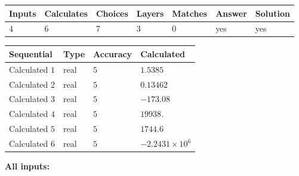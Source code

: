 \documentclass[12pt]{article}
\begin{document}
 

 
\vspace{0.3in}
   
   
   
   
\noindent\begin{tabular}{|l|l|l|l|l|l|l|}
 \hline
Inputs & Calculates & Choices & Layers & Matches & Answer & Solution \\ \hline
           4  & 
           6  & 
           7
  & 
           3  & 
           0  & 
  yes & 
  yes 
  \\ \hline
 \end{tabular}
   
   
   
   
\noindent{}
   
   
  
  
\noindent\begin{tabular}{|l|l|l|l|}
\hline
 Sequential & Type & Accuracy & Calculated \\ 
\hline
 
 
  Calculated $            1 $ & real & $            5  $ & 
 $ 1.5385 $ 
 \\  \hline  
 
 
  Calculated $            2 $ & real & $            5  $ & 
 $ 0.13462 $ 
 \\  \hline  
 
 
  Calculated $            3 $ & real & $            5  $ & 
 $ -173.08 $ 
 \\  \hline  
 
 
  Calculated $            4 $ & real & $            5  $ & 
 $ 19938. $ 
 \\  \hline  
 
 
  Calculated $            5 $ & real & $            5  $ & 
 $ 1744.6 $ 
 \\  \hline  
 
 
  Calculated $            6 $ & real & $            5  $ & 
 $ -2.2431 \times 10^{6} $ 
 \\  \hline  
 \end{tabular}
   
   
   
   
\noindent\vspace{0.1in}\hspace{-0.08in} {\textbf{\Large{All inputs: }}}
   
   
  
\end{document}

